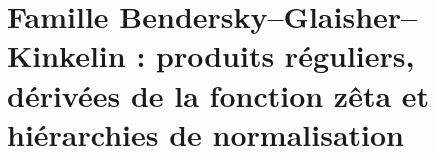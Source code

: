 \chapter{Famille Bendersky--Glaisher--Kinkelin : produits réguliers, dérivées de la fonction zêta et hiérarchies de normalisation}
\label{chap:p3-final:43:bendersky_glaisher}

